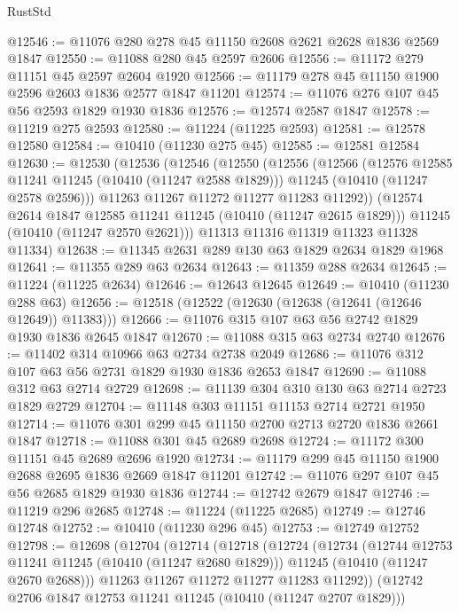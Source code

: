 \begin{lexlean}{RustStd}
\begin{coremodule}
@12546 := @11076 @280 @278 @45 @11150 @2608 @2621 @2628 @1836 @2569 @1847
@12550 := @11088 @280 @45 @2597 @2606
@12556 := @11172 @279 @11151 @45 @2597 @2604 @1920
@12566 := @11179 @278 @45 @11150 @1900 @2596 @2603 @1836 @2577 @1847 @11201
@12574 := @11076 @276 @107 @45 @56 @2593 @1829 @1930 @1836
@12576 := @12574 @2587 @1847
@12578 := @11219 @275 @2593
@12580 := @11224 (@11225 @2593)
@12581 := @12578 @12580
@12584 := @10410 (@11230 @275 @45)
@12585 := @12581 @12584
@12630 := @12530
    (@12536
      (@12546
        (@12550
          (@12556
            (@12566
              (@12576 @12585 @11241 @11245 (@10410 (@11247 @2588 @1829)))
              @11245
              (@10410 (@11247 @2578 @2596)))
            @11263
            @11267
            @11272
            @11277
            @11283
            @11292))
        (@12574 @2614 @1847 @12585 @11241 @11245 (@10410 (@11247 @2615 @1829)))
        @11245
        (@10410 (@11247 @2570 @2621)))
      @11313
      @11316
      @11319
      @11323
      @11328
      @11334)
@12638 := @11345 @2631 @289 @130 @63 @1829 @2634 @1829 @1968
@12641 := @11355 @289 @63 @2634
@12643 := @11359 @288 @2634
@12645 := @11224 (@11225 @2634)
@12646 := @12643 @12645
@12649 := @10410 (@11230 @288 @63)
@12656 := @12518 (@12522 (@12630 (@12638 (@12641 (@12646 @12649)) @11383)))
@12666 := @11076 @315 @107 @63 @56 @2742 @1829 @1930 @1836 @2645 @1847
@12670 := @11088 @315 @63 @2734 @2740
@12676 := @11402 @314 @10966 @63 @2734 @2738 @2049
@12686 := @11076 @312 @107 @63 @56 @2731 @1829 @1930 @1836 @2653 @1847
@12690 := @11088 @312 @63 @2714 @2729
@12698 := @11139 @304 @310 @130 @63 @2714 @2723 @1829 @2729
@12704 := @11148 @303 @11151 @11153 @2714 @2721 @1950
@12714 := @11076 @301 @299 @45 @11150 @2700 @2713 @2720 @1836 @2661 @1847
@12718 := @11088 @301 @45 @2689 @2698
@12724 := @11172 @300 @11151 @45 @2689 @2696 @1920
@12734 := @11179 @299 @45 @11150 @1900 @2688 @2695 @1836 @2669 @1847 @11201
@12742 := @11076 @297 @107 @45 @56 @2685 @1829 @1930 @1836
@12744 := @12742 @2679 @1847
@12746 := @11219 @296 @2685
@12748 := @11224 (@11225 @2685)
@12749 := @12746 @12748
@12752 := @10410 (@11230 @296 @45)
@12753 := @12749 @12752
@12798 := @12698
    (@12704
      (@12714
        (@12718
          (@12724
            (@12734
              (@12744 @12753 @11241 @11245 (@10410 (@11247 @2680 @1829)))
              @11245
              (@10410 (@11247 @2670 @2688)))
            @11263
            @11267
            @11272
            @11277
            @11283
            @11292))
        (@12742 @2706 @1847 @12753 @11241 @11245 (@10410 (@11247 @2707 @1829)))

\end{coremodule}
\end{lexlean}
